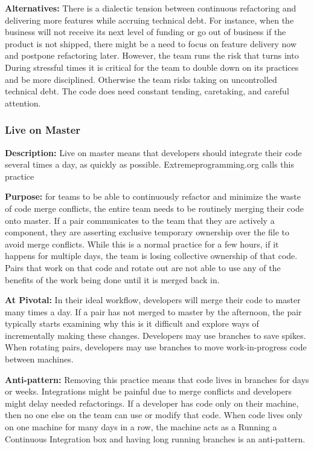 \begin{table}[]
\textbf{Alternatives:} There is a dialectic tension \cite{RalphProcessTheories} between continuous refactoring and delivering more features while accruing technical debt. For instance, when the business will not receive its next level of funding or go out of business if the product is not shipped, there might be a need to focus on feature delivery now and postpone refactoring later. However, the team runs the risk that  turns into  During stressful times it is critical for the team to double down on its practices and be more disciplined. Otherwise the team risks taking on uncontrolled technical debt. The code does need constant tending, caretaking, and careful attention.

\subsubsection{Live on Master}
\textbf{Description:} Live on master means that developers should integrate their code several times a day, as quickly as possible. Extremeprogramming.org calls this practice  \cite{IntegrateOften} 

\textbf{Purpose:} for teams to be able to continuously refactor and minimize the waste of code merge conflicts, the entire team needs to be routinely merging their code onto master.  If a pair communicates to the team that they are actively  a component, they are asserting exclusive temporary ownership over the file to avoid merge conflicts. While this is a normal practice for a few hours, if it happens for multiple days, the team is losing collective ownership of that code. Pairs that work on that code and rotate out are not able to use any of the benefits of the work being done until it is merged back in. 

\textbf{At Pivotal:} In their ideal workflow, developers will merge their code to master many times a day. If a pair has not merged to master by the afternoon, the pair typically starts examining why this is it difficult and explore ways of incrementally making these changes. Developers may use branches to save spikes. When rotating pairs, developers may use branches to move work-in-progress code between machines.  

\textbf{Anti-pattern:} Removing this practice means that code lives in branches for days or weeks. Integrations might be painful due to merge conflicts and developers might delay needed refactorings. If a developer has code only on their machine, then no one else on the team can use or modify that code. When code lives only on one machine for many days in a row, the machine acts as a  Running a Continuous Integration box and having long running branches is an anti-pattern.

\end{table}

